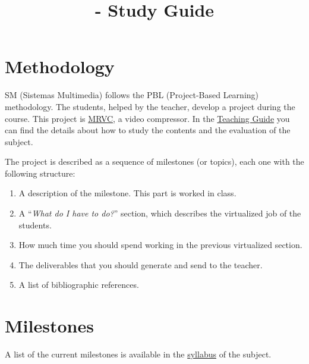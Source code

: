

\title{\SM{} - Study Guide}

\maketitle

\section{Methodology}
SM (Sistemas Multimedia) follows the PBL (Project-Based Learning)
methodology. The students, helped by the teacher, develop a project
during the course. This project is
\href{https://github.com/Sistemas-Multimedia/MRVC}{MRVC}, a video
compressor. In the
\href{https://www.ual.es/estudios/masteres/presentacion/plandeestudios/asignatura/7114/71142105}{Teaching
  Guide} you can find the details about how to study the contents and
  the evaluation of the subject.

The project is described as a sequence of milestones (or topics), each
one with the following structure:
\begin{enumerate}
\item A description of the milestone. This part is worked in class.
\item A ``\emph{What do I have to do?}'' section, which describes the
  virtualized job of the students.
\item How much time you should spend working in the previous
  virtualized section.
\item The deliverables that you should generate and send to the
  teacher.
\item A list of bibliographic references.
\end{enumerate}

\section{Milestones}
A list of the current milestones is available in the
\href{https://sistemas-multimedia.github.io/syllabus}{syllabus} of the
subject.

